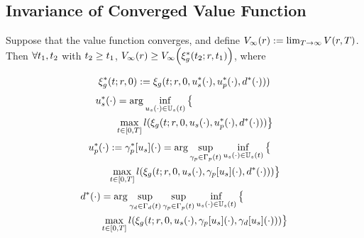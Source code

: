 \subsection{Invariance of Converged Value Function}
 \begin{prop}
   \label{prop:main}
   Suppose that the value function converges, and define $V_\infty(r) := \lim_{T\rightarrow\infty}V(r, T)$. Then $\forall t_1, t_2$ with $t_2 \ge t_1$, $V_\infty(r) \ge V_\infty\Big(\xi_g^*(t_2; r, t_1)\Big)$, where

   \begin{equation}
   \begin{aligned}
   \xi_g^*(t; r, 0) := \xi_g(t; r, 0, u_s^*(\cdot), u_p^*(\cdot), d^*(\cdot))) \\
   \end{aligned}
   \end{equation}
   \begin{equation}
   \begin{aligned}
   &u_s^*(\cdot) = \arg \inf_{u_s(\cdot)\in\mathbb{U}_s(t)}\big\{\\
   & \qquad \max_{t \in [0, T]} l(\xi_g(t; r, 0, u_s(\cdot), u_p^*(\cdot), d^*(\cdot))) \big\}\\
    \end{aligned}
   \end{equation}
   \begin{equation}
   \begin{aligned}
   & u_p^*(\cdot) := \gamma_p^*[u_s](\cdot) = \arg \sup_{\gamma_{p} \in \Gamma_p(t)} \inf_{u_s(\cdot) \in \mathbb{U}_s(t)} \big\{ \\
   & \qquad \max_{t \in [0, T]} l(\xi_g(t; r, 0, u_s(\cdot), \gamma_p[u_s](\cdot), d^*(\cdot))) \big\} \\
    \end{aligned}
   \end{equation}
   \begin{equation}
   \begin{aligned}
   & d^*(\cdot) = \arg \sup_{\gamma_{d} \in \Gamma_d(t)} \sup_{\gamma_{p} \in \Gamma_p(t)} \inf_{u_s(\cdot) \in \mathbb{U}_s(t)} \big\{\\
   & \qquad \max_{t \in [0, T]} l(\xi_g(t; r, 0, u_s(\cdot), \gamma_p[u_s](\cdot), \gamma_d[u_s](\cdot))) \big\}
   \end{aligned}
   \end{equation}
 \end{prop}

